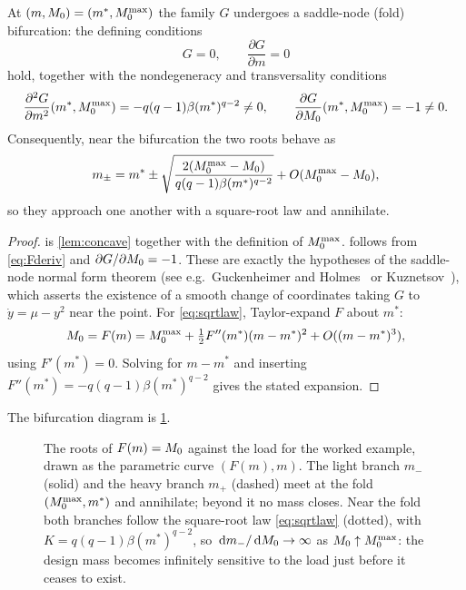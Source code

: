 \begin{theorem}
\label{thm:bifurcation}
At $(m,M_0)=(m^*,M_0^{\max})$ the family $G$ undergoes a saddle-node
(fold) bifurcation: the defining conditions
\begin{equation}
  G = 0, \qquad \frac{\partial G}{\partial m} = 0
  \label{eq:sn1}
\end{equation}
hold, together with the nondegeneracy and transversality conditions
\begin{equation}
  \frac{\partial^2 G}{\partial m^2}(m^*,M_0^{\max}) = -q(q-1)\beta (m^*)^{q-2} \ne 0,
  \qquad
  \frac{\partial G}{\partial M_0}(m^*,M_0^{\max}) = -1 \ne 0 .
  \label{eq:sn2}
\end{equation}
Consequently, near the bifurcation the two roots behave as
\begin{equation}
  m_{\pm} = m^* \pm \sqrt{\frac{2(M_0^{\max}-M_0)}{q(q-1)\beta (m^*)^{q-2}}}
            + O(M_0^{\max}-M_0) ,
  \label{eq:sqrtlaw}
\end{equation}
so they approach one another with a square-root law and annihilate.
\end{theorem}

\begin{proof}
 is \cref{lem:concave} together with the definition of $M_0^{\max}$.
 follows from \cref{eq:Fderiv} and $\partial G/\partial M_0=-1$.
These are exactly the hypotheses of the saddle-node normal form theorem
(see e.g.\ Guckenheimer and Holmes~\cite[\S3.4]{guckenheimer1983} or
Kuznetsov~\cite[\S3.2]{kuznetsov2004}), which asserts the existence of a smooth
change of coordinates taking $G$ to $\dot y = \mu - y^2$ near the point.
For \cref{eq:sqrtlaw}, Taylor-expand $F$ about $m^*$:
\[
  M_0 = F(m) = M_0^{\max} + \tfrac12 F''(m^*)(m-m^*)^2 + O((m-m^*)^3),
\]
using $F'(m^*)=0$. Solving for $m-m^*$ and inserting
$F''(m^*)=-q(q-1)\beta(m^*)^{q-2}$ gives the stated expansion.
\end{proof}

The bifurcation diagram is \cref{fig:saddlenode}.

\begin{figure}[tbp]
\centering

\caption{The roots of $F(m)=M_0$ against the load for the worked example,
drawn as the parametric curve $(F(m),m)$. The light branch $m_-$ (solid) and
the heavy branch $m_+$ (dashed) meet at the fold $(M_0^{\max},m^*)$ and annihilate;
beyond it no mass closes. Near the fold both branches follow the square-root
law \cref{eq:sqrtlaw} (dotted), with $K=q(q-1)\beta(m^*)^{q-2}$, so
$\,\mathrm{d} m_-/\,\mathrm{d}M_0\to\infty$ as $M_0\uparrow M_0^{\max}$: the design mass becomes
infinitely sensitive to the load just before it ceases to exist.}
\label{fig:saddlenode}
\end{figure}

